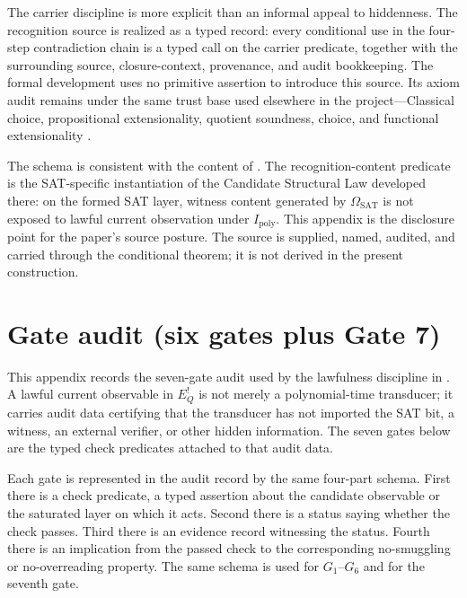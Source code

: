 \documentclass[11pt]{article}
\newcommand{\Ipoly}{I_{\mathrm{poly}}}
\newcommand{\EQbang}{E^{!}_{Q}}
\newcommand{\OmegaSAT}{\Omega_{\mathrm{SAT}}}
\newcommand{\GateOne}{G_{1}}                \newcommand{\GateTwo}{G_{2}}                \newcommand{\GateThree}{G_{3}}              \newcommand{\GateFour}{G_{4}}               \newcommand{\GateFive}{G_{5}}               \newcommand{\GateSix}{G_{6}}                \newcommand{\GateSeven}{G_{7}}
\newcommand{\CSLcore}{Candidate Structural Law}
\theoremstyle{definition}
\begin{document}
The carrier discipline is more explicit than an informal appeal to
hiddenness.  The recognition source is realized as a typed record:
every conditional use in the four-step contradiction chain is a typed
call on the carrier predicate, together with the surrounding source,
closure-context, provenance, and audit bookkeeping.  The formal
development uses no primitive assertion to introduce this source.
Its axiom audit remains under the same trust base used elsewhere in
the project---Classical choice, propositional extensionality,
quotient soundness, choice, and functional extensionality
\citep{MartinLof1984IntuitionisticTypeTheory}.

The schema is consistent with the content of
\citet{TsiokosHiddenness2026}.  The recognition-content predicate is
the SAT-specific instantiation of the \CSLcore{} developed there: on
the formed SAT layer, witness content generated by \(\OmegaSAT\) is
not exposed to lawful current observation under \(\Ipoly\).  This
appendix is the disclosure point for the paper's source posture.  The
source is supplied, named, audited, and carried through the
conditional theorem; it is not derived in the present construction.
 

\section{Gate audit (six gates plus Gate 7)}
\label{app:gate-audit}

This appendix records the seven-gate audit used by the lawfulness
discipline in .  A lawful current
observable in \(\EQbang\) is not merely a polynomial-time transducer;
it carries audit data certifying that the transducer has not imported
the SAT bit, a witness, an external verifier, or other hidden
information.  The seven gates below are the typed check predicates
attached to that audit data.

Each gate is represented in the audit record by the same four-part
schema.  First there is a check predicate, a typed assertion about the
candidate observable or the saturated layer on which it acts.  Second
there is a status saying whether the check passes.  Third there is an
evidence record witnessing the status.  Fourth there is an implication
from the passed check to the corresponding no-smuggling or
no-overreading property.  The same schema is used for
\(\GateOne\)--\(\GateSix\) and for the seventh gate.
\end{document}
